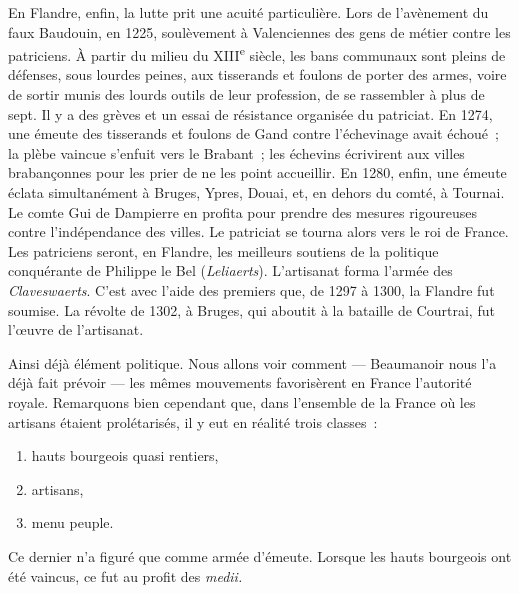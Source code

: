\documentclass[french,twoside]{book} %
\begin{document}
En Flandre, enfin, la lutte prit une acuité particulière. Lors de l’avènement du faux Baudouin, en 1225, soulèvement à Valenciennes des gens de métier contre les patriciens. À partir du milieu du XIII\textsuperscript{e} siècle, les bans communaux sont pleins de défenses, sous lourdes peines, aux tisserands et foulons de porter des armes, voire de sortir munis des lourds outils de leur profession, de se rassembler à plus de sept. Il y a des grèves et un essai de résistance organisée du patriciat. En 1274, une émeute des tisserands et foulons de Gand contre l’échevinage avait échoué ; la plèbe vaincue s’enfuit vers le Brabant ; les échevins écrivirent aux villes brabançonnes pour les prier de ne les point accueillir. En 1280, enfin, une émeute éclata simultanément à Bruges, Ypres, Douai, et, en dehors du comté, à Tournai. Le comte Gui de Dampierre en profita pour prendre des mesures rigoureuses contre l’indépendance des villes. Le patriciat se tourna alors vers le roi de France. Les patriciens seront, en Flandre, les meilleurs soutiens de la politique conquérante de Philippe le Bel ({\itshape Leliaerts}). L’artisanat forma l’armée des {\itshape Claveswaerts}. C’est avec l’aide des premiers que, de 1297 à 1300, la Flandre fut soumise. La révolte de 1302, à Bruges, qui aboutit à la bataille de Courtrai, fut l’œuvre de l’artisanat.\par
Ainsi déjà élément politique. Nous allons voir comment — Beaumanoir nous l’a déjà fait prévoir — les mêmes mouvements favorisèrent en France l’autorité royale. Remarquons bien cependant que, dans l’ensemble de la France où les artisans étaient prolétarisés, il y eut en réalité trois classes :\par

\begin{enumerate}[itemsep=0pt,]
\item hauts bourgeois quasi rentiers,
\item artisans,
\item menu peuple.
\end{enumerate}

\noindent Ce dernier n’a figuré que comme armée d’émeute. Lorsque les hauts bourgeois ont été vaincus, ce fut au profit des {\itshape medii.}
\end{document}
